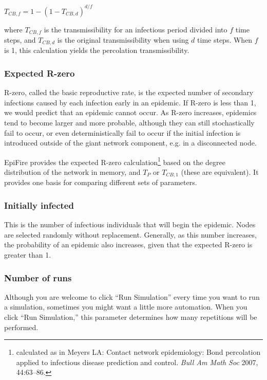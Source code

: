 \documentclass{article}
\begin{document}
\vspace{15 pt}

$T_{CB, f} = 1 - (1-T_{CB, d})^{d/f}$

\vspace{15 pt}

where $T_{CB, f}$ is the transmissibility for an infectious period divided into $f$ time steps, and $T_{CB, d}$ is the original transmissibility when using $d$ time steps.  When $f$ is 1, this calculation yields the percolation transmissibility.

\subsubsection{Expected R-zero}
R-zero, called the basic reproductive rate, is the expected number of secondary infections caused by each infection early in an epidemic.  If R-zero is less than 1, we would predict that an epidemic cannot occur.  As R-zero increases, epidemics tend to become larger and more probable, although they can still stochastically fail to occur, or even deterministically fail to occur if the initial infection is introduced outside of the giant network component, e.g. in a disconnected node.

EpiFire provides the expected R-zero calculation\footnote{calculated as in Meyers LA: Contact network epidemiology: Bond percolation applied to infectious disease prediction and control. \textit{Bull Am Math Soc} 2007, 44:63–86.} based on the degree distribution of the network in memory, and $T_{P}$ or $T_{CB, 1}$ (these are equivalent).  It provides one basis for comparing different sets of parameters.

\subsubsection{Initially infected}
This is the number of infectious individuals that will begin the epidemic.  Nodes are selected randomly without replacement.  Generally, as this number increases, the probability of an epidemic also increases, given that the expected R-zero is greater than 1.

\subsubsection{Number of runs}
Although you are welcome to click ``Run Simulation'' every time you want to run a simulation, sometimes you might want a little more automation.  When you click ``Run Simulation,'' this parameter determines how many repetitions will be performed.
\end{document}
